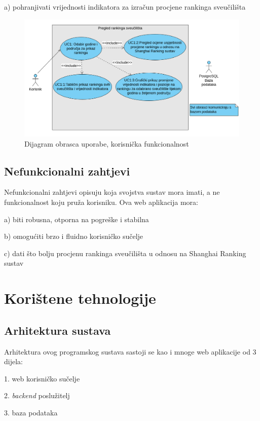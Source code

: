 \documentclass[times, utf8, zavrsni]{fer}
\begin{document}
a) pohranjivati vrijednosti indikatora za izračun procjene rankinga sveučilišta
\\
\begin{figure}[htb]
    
    \includegraphics[scale=0.4]{slika1.png}
    \caption{Dijagram obrasca uporabe, korisnička funkcionalnost}
    \label{fig:korisnik}
    \end{figure}
\newpage
\section{Nefunkcionalni zahtjevi}
Nefunkcionalni zahtjevi opisuju koja svojstva sustav mora imati, a ne funkcionalnost koju pruža korisniku. Ova web aplikacija mora:

a) biti robusna, otporna na pogreške i stabilna

b) omogućiti brzo i fluidno korisničko sučelje

c) dati što bolju procjenu rankinga sveučilišta u odnosu na Shanghai Ranking sustav

\chapter{Korištene tehnologije}
\section{Arhitektura sustava}
\label{arhitektura}
Arhitektura ovog programskog sustava sastoji se kao i mnoge web aplikacije od 3 dijela:

1. web korisničko sučelje

2. \emph{backend} poslužitelj

3. baza podataka
\end{document}
